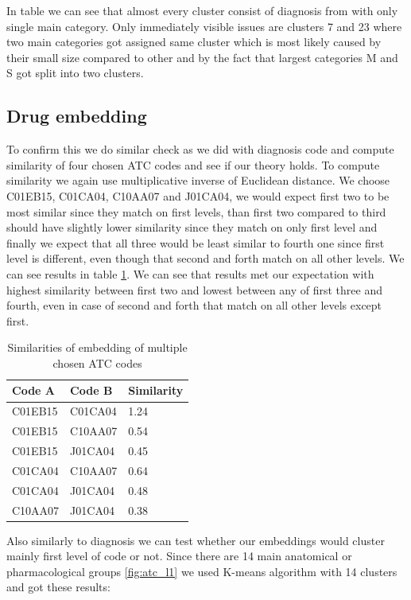 In table we can see that almost every cluster consist of diagnosis from with only single main category. Only immediately visible issues are clusters 7 and 23 where two main categories got assigned same cluster which is most likely caused by their small size compared to other and by the fact that largest categories M and S got split into two clusters.

\subsection{Drug embedding}

To confirm this we do similar check as we did with diagnosis code and compute similarity of four chosen ATC codes and see if our theory holds. To compute similarity we again use multiplicative inverse of Euclidean distance. We choose C01EB15, C01CA04, C10AA07 and J01CA04, we would expect first two to be most similar since they match on first levels, than first two compared to third should have slightly lower similarity since they match on only first level and finally we expect that all three would be least similar to fourth one since first level is different, even though that second and forth match on all other levels.  We can see results in table \ref{tab:drug_emb_show}. We can see that results met our expectation with highest similarity between first two and lowest between any of first three and fourth, even in case of second and forth that match on all other levels except first.

\begin{table}[!h]
	\centering
	\begin{tabular}{|l|l|l|}
		\hline
		Code A & Code B & Similarity \\ \hline
		C01EB15 & C01CA04 & 1.24      \\ \hline
		C01EB15 & C10AA07 & 0.54       \\ \hline
		C01EB15 & J01CA04 & 0.45       \\ \hline
		C01CA04 & C10AA07 & 0.64       \\ \hline
		C01CA04 & J01CA04 & 0.48       \\ \hline
		C10AA07 & J01CA04 & 0.38       \\ \hline
	\end{tabular}
	\caption{Similarities of embedding of multiple chosen ATC codes}
	\label{tab:drug_emb_show}
\end{table}  

Also similarly to diagnosis we can test whether our embeddings would cluster mainly first level of code or not. Since there are 14 main anatomical or pharmacological groups \ref{fig:atc_l1} we used K-means algorithm with 14 clusters and got these results:
\\

